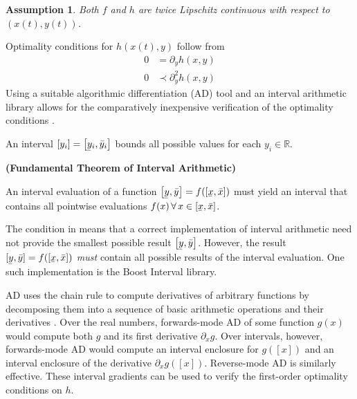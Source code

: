 \documentclass[twoside,leqno, twocolumn]{article}
\newcommand{\bbR}{\ensuremath{\mathbb{R}}}
\newcommand\ubar[1]{\underaccent{\bar}{#1}}
\newtheorem{assumption}{Assumption}[section]
\begin{document}
\begin{assumption} 
	\label{assume:twice-lipschitz}
	Both $f$ and $h$ are twice Lipschitz continuous with respect to $(x(t), y(t))$.
\end{assumption}
Optimality conditions for $h(x(t), y)$ follow from 
\begin{equation}
	\label{eq:optimality-conditions}
	\begin{aligned}
		0 &= \partial_yh(x, y)\\
		0 &\prec\partial^2_{y}h(x, y)
	\end{aligned}
\end{equation}
Using a suitable algorithmic differentiation (AD) tool and an interval arithmetic library allows for the comparatively inexpensive verification of the optimality conditions \cite{rallGlobalOptimizationUsing1985}. 

An interval $[y_i] = \left[\ubar y_i, \bar y_i\right]$ bounds all possible values for each $y_i\in\bbR$. 
\begin{Definition}
	\label{def:interval-arith}
	\textbf{(Fundamental Theorem of Interval Arithmetic)}
	
	An interval evaluation of a function $\left[\ubar{y},\bar{y}\right] = f(\left[\ubar x, \bar x\right])$ must yield an interval that contains all pointwise evaluations $f(x)\,\forall\,x\in\left[\ubar x, \bar x\right]$.
\end{Definition}
The condition in  means that a correct implementation of interval arithmetic need not provide the smallest possible result $\left[\ubar y, \bar y\right]$\cite{hickeyIntervalArithmeticPrinciples2001}. However, the result $[\ubar y, \bar y] = f(\left[\ubar x, \bar x\right])$ \textit{must} contain all possible results of the interval evaluation. One such implementation is the Boost Interval library\cite{melquiondBoostIntervalLibrary2022}.

AD uses the chain rule to compute derivatives of arbitrary functions by decomposing them into a sequence of basic arithmetic operations and their derivatives \cite{griewankEvaluatingDerivativesPrinciples2008}. Over the real numbers, forwards-mode AD of some function $g(x)$ would compute both $g$ and its first derivative $\partial_x g$. Over intervals, however, forwards-mode AD would compute an interval enclosure for $g(\left[x\right])$ and an interval enclosure of the derivative $\partial_xg(\left[x\right])$\cite{rallGlobalOptimizationUsing1985}. Reverse-mode AD is similarly effective. These interval gradients can be used to verify the first-order optimality conditions on $h$.
\end{document}
